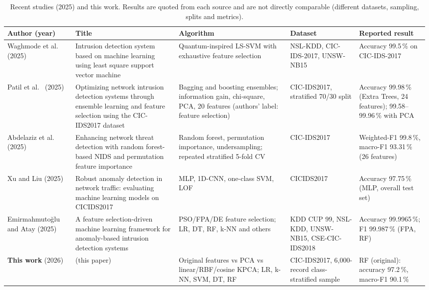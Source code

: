 \documentclass[runningheads]{llncs}
\begin{document}
\begin{table}[!b]
\caption{Recent studies (2025) and this work. Results are quoted from each source and are not directly comparable (different datasets, sampling, splits and metrics).}\label{tab:lit}
\centering\scriptsize
\renewcommand{\arraystretch}{1.15}
\begin{tabular}{@{}>{\raggedright\arraybackslash}p{2.3cm}>{\raggedright\arraybackslash}p{3.3cm}>{\raggedright\arraybackslash}p{2.4cm}>{\raggedright\arraybackslash}p{1.7cm}>{\raggedright\arraybackslash}p{1.7cm}@{}}
\toprule
Author (year) & Title & Algorithm & Dataset & Reported result \\
\midrule
Waghmode et al.\ \cite{waghmode2025} (2025) & Intrusion detection system based on machine learning using least square support vector machine & Quantum-inspired LS-SVM with exhaustive feature selection & NSL-KDD, CIC-IDS-2017, UNSW-NB15 & Accuracy 99.5\,\% on CIC-IDS-2017 \\
Patil et al.\ \cite{patil2025} (2025) & Optimizing network intrusion detection systems through ensemble learning and feature selection using the CIC-IDS2017 dataset & Bagging and boosting ensembles; information gain, chi-square, PCA, 20 features (authors' label: feature selection) & CIC-IDS2017, stratified 70/30 split & Accuracy 99.98\,\% (Extra Trees, 24 features); 99.58--99.96\,\% with PCA \\
Abdelaziz et al.\ \cite{abdelaziz2025} (2025) & Enhancing network threat detection with random forest-based NIDS and permutation feature importance & Random forest, permutation importance, undersampling; repeated stratified 5-fold CV & CIC-IDS2017 & Weighted-F1 99.8\,\%, macro-F1 93.31\,\% (26 features) \\
Xu and Liu \cite{xu2025} (2025) & Robust anomaly detection in network traffic: evaluating machine learning models on CICIDS2017 & MLP, 1D-CNN, one-class SVM, LOF & CICIDS2017 & Accuracy 97.75\,\% (MLP, overall test set) \\
Emirmahmuto\u{g}lu and Atay \cite{emirmahmutoglu2025} (2025) & A feature selection-driven machine learning framework for anomaly-based intrusion detection systems & PSO/FPA/DE feature selection; LR, DT, RF, k-NN and others & KDD CUP 99, NSL-KDD, UNSW-NB15, CSE-CIC-IDS2018 & Accuracy 99.9965\,\%; F1 99.987\,\% (FPA, RF) \\
\midrule
\textbf{This work} (2026) & (this paper) & Original features vs PCA vs linear/RBF/cosine KPCA; LR, k-NN, SVM, DT, RF & CIC-IDS2017, 6,000-record class-stratified sample & RF (original): accuracy 97.2\,\%, macro-F1 90.1\,\% \\
\bottomrule
\end{tabular}
\end{table}
\end{document}
